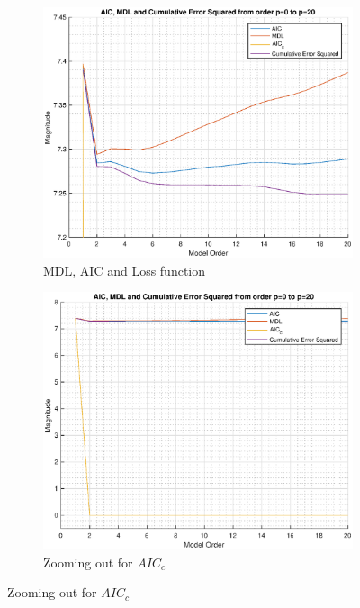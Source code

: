 \documentclass{article}
\begin{document}
\begin{figure}[h!]
\centering
\begin{subfigure}{0.32\textwidth}
\centering
\includegraphics[width = \textwidth]{heart_mdl_t2_zoom}
\caption{MDL, AIC and Loss function}
\label{fig:heart_mdl_t2_zoom}
\end{subfigure}
\begin{subfigure}{0.32\textwidth}
\centering
\includegraphics[width = \textwidth]{heart_mdl_t2}
\caption{Zooming out for $AIC_c$}
\label{fig:heart_mdl_t2}
\end{subfigure}

\end{figure}
\end{document}
